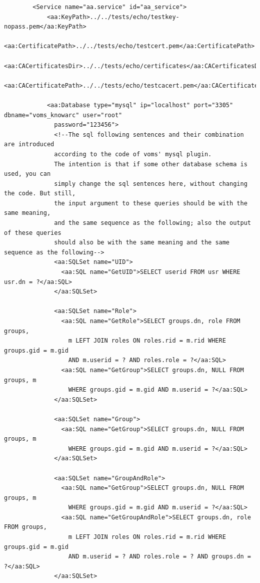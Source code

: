 \documentclass{article}                            %
\begin{document}
\begin{verbatim}
        <Service name="aa.service" id="aa_service">
            <aa:KeyPath>../../tests/echo/testkey-nopass.pem</aa:KeyPath>
            <aa:CertificatePath>../../tests/echo/testcert.pem</aa:CertificatePath>
            <aa:CACertificatesDir>../../tests/echo/certificates</aa:CACertificatesDir>
            <aa:CACertificatePath>../../tests/echo/testcacert.pem</aa:CACertificatePath>

            <aa:Database type="mysql" ip="localhost" port="3305" dbname="voms_knowarc" user="root"
              password="123456">
              <!--The sql following sentences and their combination are introduced
              according to the code of voms' mysql plugin.
              The intention is that if some other database schema is used, you can
              simply change the sql sentences here, without changing the code. But still,
              the input argument to these queries should be with the same meaning,
              and the same sequence as the following; also the output of these queries
              should also be with the same meaning and the same sequence as the following-->
              <aa:SQLSet name="UID">
                <aa:SQL name="GetUID">SELECT userid FROM usr WHERE usr.dn = ?</aa:SQL>
              </aa:SQLSet>

              <aa:SQLSet name="Role">
                <aa:SQL name="GetRole">SELECT groups.dn, role FROM groups,
                  m LEFT JOIN roles ON roles.rid = m.rid WHERE groups.gid = m.gid
                  AND m.userid = ? AND roles.role = ?</aa:SQL>
                <aa:SQL name="GetGroup">SELECT groups.dn, NULL FROM groups, m
                  WHERE groups.gid = m.gid AND m.userid = ?</aa:SQL>
              </aa:SQLSet>

              <aa:SQLSet name="Group">
                <aa:SQL name="GetGroup">SELECT groups.dn, NULL FROM groups, m
                  WHERE groups.gid = m.gid AND m.userid = ?</aa:SQL>
              </aa:SQLSet>

              <aa:SQLSet name="GroupAndRole">
                <aa:SQL name="GetGroup">SELECT groups.dn, NULL FROM groups, m
                  WHERE groups.gid = m.gid AND m.userid = ?</aa:SQL>
                <aa:SQL name="GetGroupAndRole">SELECT groups.dn, role FROM groups,
                  m LEFT JOIN roles ON roles.rid = m.rid WHERE groups.gid = m.gid
                  AND m.userid = ? AND roles.role = ? AND groups.dn = ?</aa:SQL>
              </aa:SQLSet>


\end{verbatim}
\end{document}
